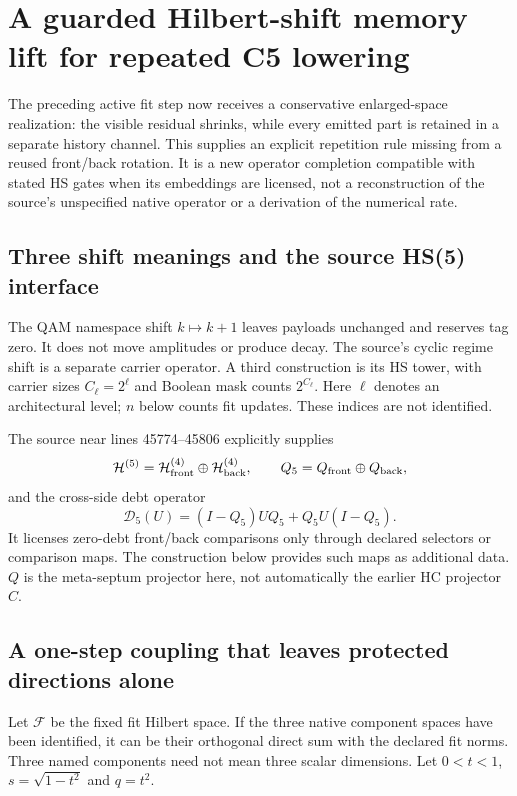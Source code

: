 \documentclass[11pt,a4paper]{article}
\begin{document}
\section{A guarded Hilbert-shift memory lift for repeated C5 lowering}
\label{sec:hilbert-shift-memory-lift}
The preceding active fit step now receives a conservative enlarged-space
realization: the visible residual shrinks, while every emitted part is
retained in a separate history channel. This supplies an explicit
repetition rule missing from a reused front/back rotation. It is a new
operator completion compatible with stated HS gates when its embeddings
are licensed, not a reconstruction of the source's unspecified native
operator or a derivation of the numerical rate.

\subsection{Three shift meanings and the source HS(5) interface}
The QAM namespace shift $k\mapsto k+1$ leaves payloads unchanged and
reserves tag zero. It does not move amplitudes or produce decay. The
source's cyclic regime shift is a separate carrier operator. A third
construction is its HS tower, with carrier sizes $C_\ell=2^\ell$ and
Boolean mask counts $2^{C_\ell}$. Here $\ell$ denotes an architectural
level; $n$ below counts fit updates. These indices are not identified.

The source near lines 45774--45806 explicitly supplies
\[
 \mathcal H^{(5)}
 =\mathcal H^{(4)}_{\rm front}\oplus\mathcal H^{(4)}_{\rm back},
 \qquad Q_5=Q_{\rm front}\oplus Q_{\rm back},
\]
and the cross-side debt operator
\[
 \mathcal D_5(U)=(I-Q_5)UQ_5+Q_5U(I-Q_5).
\]
It licenses zero-debt front/back comparisons only through declared
selectors or comparison maps. The construction below provides such
maps as additional data. $Q$ is the meta-septum projector here, not
automatically the earlier HC projector $C$.

\subsection{A one-step coupling that leaves protected directions alone}
Let $\mathcal F$ be the fixed fit Hilbert space. If the three native
component spaces have been identified, it can be their orthogonal direct
sum with the declared fit norms. Three named components need not mean
three scalar dimensions. Let $0<t<1$, $s=\sqrt{1-t^2}$ and $q=t^2$.
\end{document}
